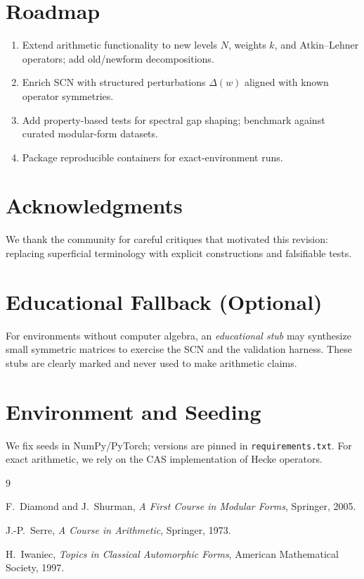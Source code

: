 \documentclass[11pt]{article}
\theoremstyle{definition}
\theoremstyle{remark}
\begin{document}
\section{Roadmap}
\label{sec:roadmap}
\begin{enumerate}[leftmargin=*,itemsep=2pt]
  \item Extend arithmetic functionality to new levels \(N\), weights \(k\), and Atkin--Lehner operators; add old/newform decompositions.
  \item Enrich SCN with structured perturbations \(\Delta(w)\) aligned with known operator symmetries.
  \item Add property-based tests for spectral gap shaping; benchmark against curated modular-form datasets.
  \item Package reproducible containers for exact-environment runs.
\end{enumerate}

\section*{Acknowledgments}
We thank the community for careful critiques that motivated this revision: replacing superficial terminology with explicit constructions and falsifiable tests.

\appendix

\section{Educational Fallback (Optional)}
\label{app:fallback}
For environments without computer algebra, an \emph{educational stub} may synthesize small symmetric matrices to exercise the SCN and the validation harness.
These stubs are clearly marked and never used to make arithmetic claims.

\section{Environment and Seeding}
\label{app:env}
We fix seeds in NumPy/PyTorch; versions are pinned in \texttt{requirements.txt}. For exact arithmetic, we rely on the CAS implementation of Hecke operators.

\begin{thebibliography}{9}

F.~Diamond and J.~Shurman,
\newblock \emph{A First Course in Modular Forms},
\newblock Springer, 2005.

J.-P.~Serre,
\newblock \emph{A Course in Arithmetic},
\newblock Springer, 1973.

H.~Iwaniec,
\newblock \emph{Topics in Classical Automorphic Forms},
\newblock American Mathematical Society, 1997.

\end{thebibliography}
\end{document}
